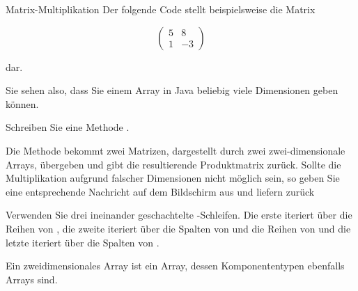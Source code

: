 \documentclass{../tuda-exercise}
\begin{document}
  \begin{task}[credit=\stars{2}{3}]{Matrix-Multiplikation}
    Der folgende Code stellt beispielsweise die Matrix

    \begin{equation*}
      \begin{pmatrix}
        5 & 8
        \\
        1 & -3
      \end{pmatrix}
    \end{equation*}

    dar.

    
    Sie sehen also, dass Sie einem Array in Java beliebig viele Dimensionen geben können.

    \br

    Schreiben Sie eine Methode .

    \br

    Die Methode bekommt zwei Matrizen, dargestellt durch zwei zwei-dimensionale Arrays, übergeben
    und gibt die resultierende Produktmatrix zurück. Sollte die Multiplikation aufgrund falscher
    Dimensionen nicht möglich sein, so geben Sie eine entsprechende Nachricht auf dem Bildschirm
    aus und liefern  zurück

    \br

    \begin{note}[title=Hinweis:, color=tuda-orange]
      Verwenden Sie drei ineinander geschachtelte -Schleifen. Die erste iteriert
      über die Reihen von , die zweite iteriert über die Spalten von
       und die Reihen von  und die letzte iteriert über die
      Spalten von .
    \end{note}

    \clearpagesolution

    \begin{solution}
      

      \begin{note}[title=Information:]
        Ein zweidimensionales Array ist ein Array, dessen Komponententypen ebenfalls Arrays sind.


\end{note}
\end{solution}
\end{task}
\end{document}
